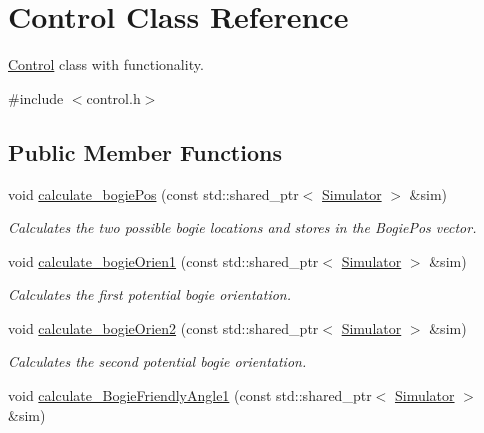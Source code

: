\hypertarget{classControl}{}\section{Control Class Reference}
\label{classControl}


\hyperlink{classControl}{Control} class with functionality.  




{\ttfamily \#include $<$control.\+h$>$}

\subsection*{Public Member Functions}
\begin{DoxyCompactItemize}
\item 
void \hyperlink{classControl_a8750b56dd5499933a8f90e8902039481}{calculate\+\_\+bogie\+Pos} (const std\+::shared\+\_\+ptr$<$ \hyperlink{classSimulator}{Simulator} $>$ \&sim)\hypertarget{classControl_a8750b56dd5499933a8f90e8902039481}{}\label{classControl_a8750b56dd5499933a8f90e8902039481}

\begin{DoxyCompactList}\small\item\em Calculates the two possible bogie locations and stores in the Bogie\+Pos vector. \end{DoxyCompactList}\item 
void \hyperlink{classControl_adaadd1652fd79cefbbc2e5ecf1d67773}{calculate\+\_\+bogie\+Orien1} (const std\+::shared\+\_\+ptr$<$ \hyperlink{classSimulator}{Simulator} $>$ \&sim)\hypertarget{classControl_adaadd1652fd79cefbbc2e5ecf1d67773}{}\label{classControl_adaadd1652fd79cefbbc2e5ecf1d67773}

\begin{DoxyCompactList}\small\item\em Calculates the first potential bogie orientation. \end{DoxyCompactList}\item 
void \hyperlink{classControl_af91542ce6039d7acc4fe43b5e9e47abe}{calculate\+\_\+bogie\+Orien2} (const std\+::shared\+\_\+ptr$<$ \hyperlink{classSimulator}{Simulator} $>$ \&sim)\hypertarget{classControl_af91542ce6039d7acc4fe43b5e9e47abe}{}\label{classControl_af91542ce6039d7acc4fe43b5e9e47abe}

\begin{DoxyCompactList}\small\item\em Calculates the second potential bogie orientation. \end{DoxyCompactList}\item 
void \hyperlink{classControl_a94d0560fd8b0157834c8ae919635246b}{calculate\+\_\+\+Bogie\+Friendly\+Angle1} (const std\+::shared\+\_\+ptr$<$ \hyperlink{classSimulator}{Simulator} $>$ \&sim)\hypertarget{classControl_a94d0560fd8b0157834c8ae919635246b}{}\label{classControl_a94d0560fd8b0157834c8ae919635246b}


\end{DoxyCompactItemize}
